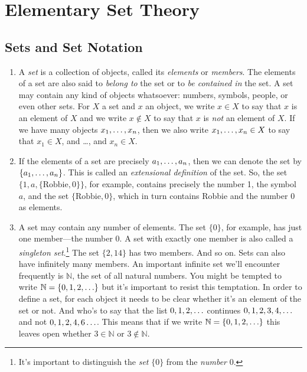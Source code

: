 \chapter{Elementary Set Theory}
\label{sets}


\section{Sets and Set Notation}
\label{sets:notation}

\begin{enumerate}[{\thesection}.1]

	\item A \emph{set} is a collection of objects, called its \emph{elements} or \emph{members}. The elements of a set are also said to \emph{belong to} the set or to \emph{be contained in} the set. A set may contain any kind of objects whatsoever: numbers, symbols, people, or even other sets. For $X$ a set and $x$ an object, we write $x\in X$ to say that $x$ is an element of $X$ and we write $x
\not\in X$ to say that $x$ is \emph{not} an element of $X$. If we have many objects $x_1, \mathellipsis, x_n$, then we also write $x_1, \mathellipsis, x_n\in X$ to say that $x_1\in X$, and \dots, and $x_n\in X$.

		\item If the elements of a set are precisely $a_1, \mathellipsis, a_n$, then we can denote the set by $\{a_1, \mathellipsis, a_n\}$. This is called an \emph{extensional definition} of the set. So, the set $\{1,a, \{\text{Robbie},0\}\}$, for example, contains precisely the number 1, the symbol $a$, and the set $ \{\text{Robbie},0\}$, which in turn contains Robbie and the number 0 as elements.

	\item A set may contain any number of elements. The set $\{0\}$, for example, has just one member---the number 0. A set with exactly one member is also called a \emph{singleton set}.\footnote{It's important to distinguish the \emph{set} $\{0\}$ from the \emph{number} $0$.} The set $\{2, 14\}$ has two members. And so on. Sets can also have infinitely many members. An important infinite set we'll encounter frequently is $\mathbb{N}$, the set of all natural numbers. You might be tempted to write $\mathbb{N}=\{0,1,2,\mathellipsis\}$ but it's important to resist this temptation. In order to define a set, for each object it needs to be clear whether it's an element of the set or not. And who's to say that the list $0,1,2,\mathellipsis$ continues $0,1,2,3,4,\mathellipsis$ and not $0,1,2,4,6\mathellipsis$. This means that if we write $\mathbb{N}=\{0,1,2,\mathellipsis\}$ this leaves open whether $3\in \mathbb{N}$ or $3\notin\mathbb{N}$.
	

\end{enumerate}
